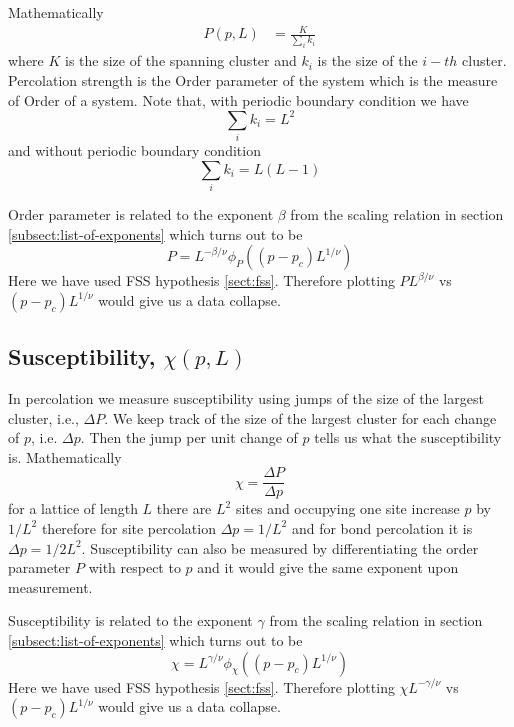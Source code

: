 	    Mathematically
		\begin{align}
			P(p,L) &= \frac{K}{\sum_{i} k_i}
			\label{def:order-parameter}
		\end{align}
		where $K$ is the size of the spanning cluster and $k_i$ is the size of the $i-th$ cluster.
		Percolation strength is the Order parameter of the system which is the measure of Order of a system.
		Note that, with periodic boundary condition we have
		\begin{equation}
			\sum_{i} k_i = L^2
		\end{equation}
		and without periodic boundary condition
		\begin{equation}
			\sum_{i} k_i = L(L-1)
		\end{equation}
		
		Order parameter is related to the exponent $\beta$		from the scaling relation in section \ref{subsect:list-of-exponents} which turns out to be
		\begin{equation}
		P = L^{-\beta/\nu} \phi_P(\left(p-p_c\right)L^{1/\nu})
		\end{equation}
		Here we have used FSS hypothesis \ref{sect:fss}.
		Therefore plotting $P L^{\beta/\nu}$ vs $\left(p-p_c\right)L^{1/\nu}$ would give us a data collapse.
			 
			 
	\subsection{Susceptibility, $\chi(p,L)$}
		In percolation we measure susceptibility using jumps of the size of the largest cluster, i.e., $\Delta P$. We keep track of the size of the largest cluster for each change of $p$, i.e. $\Delta p$. Then the jump per unit change of $p$ tells us what the susceptibility is. Mathematically
		\begin{equation}
			\chi = \frac{\Delta P}{\Delta p}
		\end{equation}
		for a lattice of length $L$ there are $L^2$ sites and occupying one site increase $p$ by $1/L^2$ therefore for site percolation $\Delta p = 1 /L^2$ and for bond percolation it is $\Delta p = 1 / 2 L^2$.		Susceptibility can also be measured by differentiating the order parameter $P$ with respect to $p$ and it would give the same exponent upon measurement.
		
		
		Susceptibility is related to the exponent $\gamma$		from the scaling relation in section \ref{subsect:list-of-exponents} which turns out to be
		\begin{equation}
		\chi = L^{\gamma/\nu} \phi_\chi(\left(p-p_c\right)L^{1/\nu})
		\end{equation}
		Here we have used FSS hypothesis \ref{sect:fss}.
		 Therefore plotting $\chi L^{-\gamma/\nu}$ vs $\left(p-p_c\right)L^{1/\nu}$ would give us a data collapse.
		 

